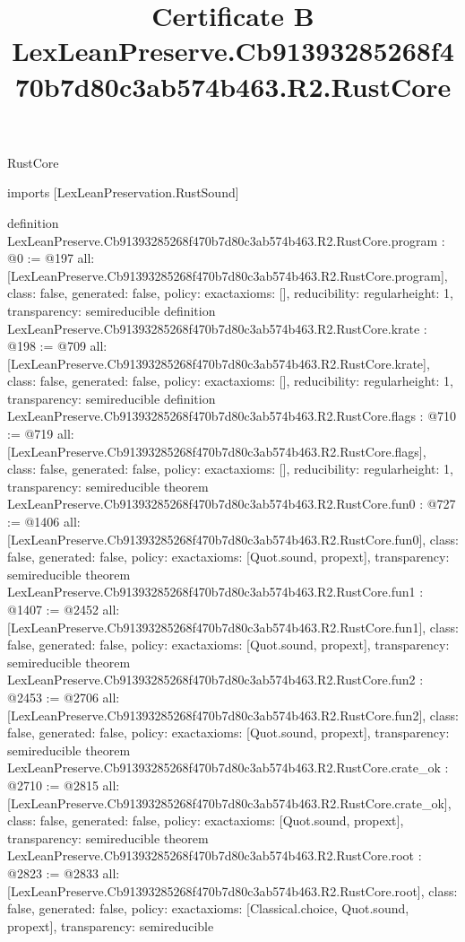 \begin{lexlean}{RustCore}
\title{Certificate B LexLeanPreserve.Cb91393285268f470b7d80c3ab574b463.R2.RustCore}
\begin{coremodule}
imports [LexLeanPreservation.RustSound]

definition LexLeanPreserve.Cb91393285268f470b7d80c3ab574b463.R2.RustCore.program : @0 := @197 {
  all: [LexLeanPreserve.Cb91393285268f470b7d80c3ab574b463.R2.RustCore.program],
  class: false,
  generated: false,
  policy: exact{axioms: []},
  reducibility: regular{height: 1},
  transparency: semireducible
}
definition LexLeanPreserve.Cb91393285268f470b7d80c3ab574b463.R2.RustCore.krate : @198 := @709 {
  all: [LexLeanPreserve.Cb91393285268f470b7d80c3ab574b463.R2.RustCore.krate],
  class: false,
  generated: false,
  policy: exact{axioms: []},
  reducibility: regular{height: 1},
  transparency: semireducible
}
definition LexLeanPreserve.Cb91393285268f470b7d80c3ab574b463.R2.RustCore.flags : @710 := @719 {
  all: [LexLeanPreserve.Cb91393285268f470b7d80c3ab574b463.R2.RustCore.flags],
  class: false,
  generated: false,
  policy: exact{axioms: []},
  reducibility: regular{height: 1},
  transparency: semireducible
}
theorem LexLeanPreserve.Cb91393285268f470b7d80c3ab574b463.R2.RustCore.fun0 : @727 := @1406 {
  all: [LexLeanPreserve.Cb91393285268f470b7d80c3ab574b463.R2.RustCore.fun0],
  class: false,
  generated: false,
  policy: exact{axioms: [Quot.sound, propext]},
  transparency: semireducible
}
theorem LexLeanPreserve.Cb91393285268f470b7d80c3ab574b463.R2.RustCore.fun1 : @1407 := @2452 {
  all: [LexLeanPreserve.Cb91393285268f470b7d80c3ab574b463.R2.RustCore.fun1],
  class: false,
  generated: false,
  policy: exact{axioms: [Quot.sound, propext]},
  transparency: semireducible
}
theorem LexLeanPreserve.Cb91393285268f470b7d80c3ab574b463.R2.RustCore.fun2 : @2453 := @2706 {
  all: [LexLeanPreserve.Cb91393285268f470b7d80c3ab574b463.R2.RustCore.fun2],
  class: false,
  generated: false,
  policy: exact{axioms: [Quot.sound, propext]},
  transparency: semireducible
}
theorem LexLeanPreserve.Cb91393285268f470b7d80c3ab574b463.R2.RustCore.crate_ok : @2710 := @2815 {
  all: [LexLeanPreserve.Cb91393285268f470b7d80c3ab574b463.R2.RustCore.crate_ok],
  class: false,
  generated: false,
  policy: exact{axioms: [Quot.sound, propext]},
  transparency: semireducible
}
theorem LexLeanPreserve.Cb91393285268f470b7d80c3ab574b463.R2.RustCore.root : @2823 := @2833 {
  all: [LexLeanPreserve.Cb91393285268f470b7d80c3ab574b463.R2.RustCore.root],
  class: false,
  generated: false,
  policy: exact{axioms: [Classical.choice, Quot.sound, propext]},
  transparency: semireducible
}


\end{coremodule}
\end{lexlean}
